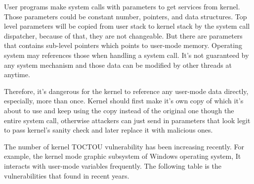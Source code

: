 User programs make system calls with parameters to get services from kernel. Those parameters could be constant number, pointers, and data structures. Top level parameters will be copied from user stack to kernel stack by the system call dispatcher, because of that, they are not changeable. But there are parameters that contains sub-level pointers which points to user-mode memory. Operating system may references those when handling a system call. It's not guaranteed by any system mechanism and those data can be modified by other threads at anytime.

Therefore, it's dangerous for the kernel to reference any user-mode data directly, especially, more than once. Kernel should first make it's own copy of which it's about to use and keep using the copy instead of the original one though the entire system call, otherwise attackers can just send in parameters that look legit to pass kernel's sanity check and later replace it with malicious ones.

The number of kernel TOCTOU vulnerability has been increasing recently. For example, the kernel mode graphic subsystem of Windows operating system, It interacts with user-mode variables frequently. The following table is the vulnerabilities that found in recent years.

